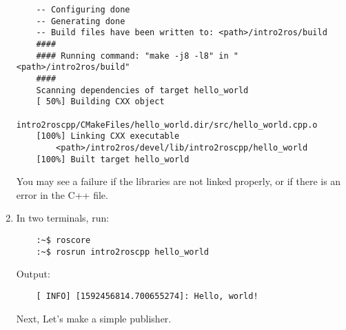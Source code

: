 \documentclass{article}
\begin{document}
\begin{enumerate}
\begin{verbatim}
    -- Configuring done
    -- Generating done
    -- Build files have been written to: <path>/intro2ros/build
    ####
    #### Running command: "make -j8 -l8" in "<path>/intro2ros/build"
    ####
    Scanning dependencies of target hello_world
    [ 50%] Building CXX object 
        intro2roscpp/CMakeFiles/hello_world.dir/src/hello_world.cpp.o
    [100%] Linking CXX executable 
        <path>/intro2ros/devel/lib/intro2roscpp/hello_world
    [100%] Built target hello_world
            \end{verbatim}
            You may see a failure if the libraries are not linked properly, or if there 
            is an error in the C++ file.
            \item In two terminals, run:
            \begin{verbatim}
    :~$ roscore
    :~$ rosrun intro2roscpp hello_world
            \end{verbatim}
            Output:
            \begin{verbatim}
    [ INFO] [1592456814.700655274]: Hello, world!
            \end{verbatim}
            Next, Let's make a simple publisher.
        \end{enumerate}
        \newpage
\end{document}
